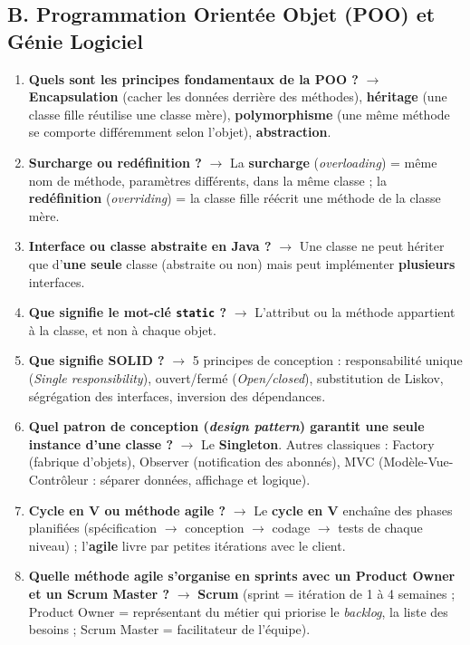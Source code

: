 \subsection*{B. Programmation Orientée Objet (POO) et Génie Logiciel}
\begin{enumerate}[leftmargin=*]
    \item \textbf{Quels sont les principes fondamentaux de la POO ?} $\rightarrow$ \textbf{Encapsulation} (cacher les données derrière des méthodes), \textbf{héritage} (une classe fille réutilise une classe mère), \textbf{polymorphisme} (une même méthode se comporte différemment selon l'objet), \textbf{abstraction}.
    \item \textbf{Surcharge ou redéfinition ?} $\rightarrow$ La \textbf{surcharge} (\textit{overloading}) = même nom de méthode, paramètres différents, dans la même classe ; la \textbf{redéfinition} (\textit{overriding}) = la classe fille réécrit une méthode de la classe mère.
    \item \textbf{Interface ou classe abstraite en Java ?} $\rightarrow$ Une classe ne peut hériter que d'\textbf{une seule} classe (abstraite ou non) mais peut implémenter \textbf{plusieurs} interfaces.
    \item \textbf{Que signifie le mot-clé \texttt{static} ?} $\rightarrow$ L'attribut ou la méthode appartient à la classe, et non à chaque objet.
    \item \textbf{Que signifie SOLID ?} $\rightarrow$ 5 principes de conception : responsabilité unique (\textit{Single responsibility}), ouvert/fermé (\textit{Open/closed}), substitution de Liskov, ségrégation des interfaces, inversion des dépendances.
    \item \textbf{Quel patron de conception (\textit{design pattern}) garantit une seule instance d'une classe ?} $\rightarrow$ Le \textbf{Singleton}. Autres classiques : Factory (fabrique d'objets), Observer (notification des abonnés), MVC (Modèle-Vue-Contrôleur : séparer données, affichage et logique).
    \item \textbf{Cycle en V ou méthode agile ?} $\rightarrow$ Le \textbf{cycle en V} enchaîne des phases planifiées (spécification $\rightarrow$ conception $\rightarrow$ codage $\rightarrow$ tests de chaque niveau) ; l'\textbf{agile} livre par petites itérations avec le client.
    \item \textbf{Quelle méthode agile s'organise en sprints avec un Product Owner et un Scrum Master ?} $\rightarrow$ \textbf{Scrum} (sprint = itération de 1 à 4 semaines ; Product Owner = représentant du métier qui priorise le \textit{backlog}, la liste des besoins ; Scrum Master = facilitateur de l'équipe).

\end{enumerate}
